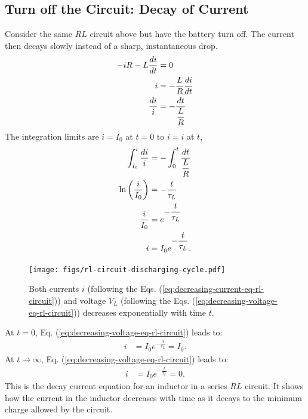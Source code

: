 \documentclass[12pt,b4paper]{article}
\begin{document}
\subsection{Turn off the Circuit: Decay of Current}
Consider the same $RL$ circuit above but have the battery turn off. The current then decays slowly instead of a sharp, instantaneous drop.
\begin{align}
    -iR-L\frac{di}{dt}&=0\notag\\
    i&=-\frac{L}{R}\frac{di}{dt}\\
    \frac{di}{i}&=-\frac{dt}{\displaystyle\frac{L}{R}}\notag
\end{align}
The integration limits are $i=I_0$ at $t=0$ to $i=i$ at $t$,
\begin{align}
    \int_{I_0}^i\frac{di}{i}&=-\int_0^t\frac{dt}{\displaystyle\frac{L}{R}}\notag\\
    \ln\left(\frac{i}{I_0}\right)&=-\frac{t}{\tau_L}\notag\\
    \frac{i}{I_0}&=e^{\displaystyle-\frac{t}{\tau_L}}\notag\\
    i&=I_0e^{\displaystyle-\frac{t}{\tau_L}}.\label{eq:decreasing-current-eq-rl-circuit}
\end{align}
\begin{figure}
    \centering
    \texttt{[image: figs/rl-circuit-discharging-cycle.pdf]}
    \caption{Both currents $i$ (following the Eqs. (\ref{eq:decreasing-current-eq-rl-circuit})) and voltage $V_L$ (following the Eqs. (\ref{eq:decreasing-voltage-eq-rl-circuit})) decreases exponentially with time $t$.}
    \label{fig:rl-discharging-cycle}
\end{figure}
At $t=0$, Eq. (\ref{eq:decreasing-voltage-eq-rl-circuit}) leads to:
\begin{align*}
    i&=I_0e^{\displaystyle-\frac{0}{\tau_L}}=I_0.
\end{align*}
At $t\to\infty$, Eq. (\ref{eq:decreasing-voltage-eq-rl-circuit}) leads to:
\begin{align*}
    i&=I_0e^{\displaystyle-\frac{t}{\tau_L}}=0.
\end{align*}
This is the decay current equation for an inductor in a series $RL$ circuit. It shows how the current in the inductor decreases with time as it decays to the minimum charge allowed by the circuit.
\end{document}
